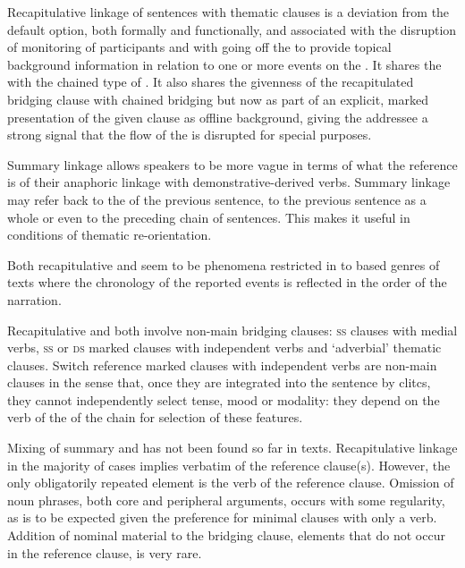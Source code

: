 \documentclass[output=paper]{LSP/langsci}
\begin{document}
Recapitulative linkage of sentences with thematic clauses is a deviation from the default option, both formally and functionally, and associated with the disruption of  monitoring of participants and with going off the  to provide topical background information in relation to one or more events on the . It shares the  with the chained type of . It also shares the givenness of the recapitulated bridging clause with chained bridging but now as part of an explicit, marked presentation of the given clause as offline background,  giving  the addressee a strong signal that the flow of the  is disrupted for special purposes.

Summary linkage allows speakers to be more vague in terms of what the reference is of their anaphoric linkage with demonstrative-derived verbs. Summary linkage may refer back to the  of the previous sentence, to the previous sentence as a whole or even to the preceding chain of sentences. This makes it useful in conditions of thematic re-orientation.

Both recapitulative and  seem to be phenomena restricted in  to  based genres of texts where the chronology of the reported events is reflected in the order of the narration. 

Recapitulative and  both involve non-main bridging clauses: \textsc{ss} clauses with medial verbs, \textsc{ss} or \textsc{ds} marked clauses with independent verbs and `adverbial' thematic clauses. Switch reference marked clauses with independent verbs are non-main clauses in the sense that, once they are integrated into the sentence by  clitcs, they cannot independently select tense, mood or modality: they depend on the verb of the  of the chain for selection of these features.

Mixing of summary and  has not been found so far in  texts. Recapitulative linkage in the majority of cases implies verbatim  of the reference clause(s). However, the only obligatorily repeated element is the verb of the reference clause. Omission of noun phrases, both core and peripheral arguments, occurs with some regularity, as is to be expected given the preference for minimal clauses with only a verb. Addition of nominal material to the bridging clause, elements that do not occur in the reference clause, is very rare.
\end{document}
